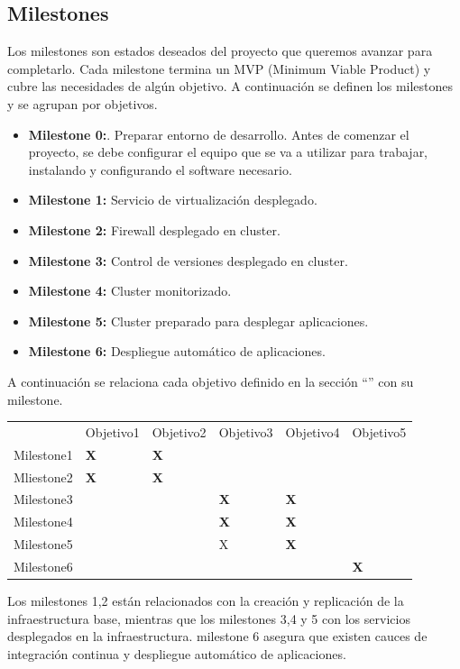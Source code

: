 \subsection{Milestones}
\label{Milestones}
\begin{text}
	Los milestones son estados deseados del proyecto que queremos avanzar para completarlo. Cada milestone termina un MVP (Minimum Viable Product) y cubre las necesidades de algún objetivo. A continuación se definen los milestones y se agrupan por objetivos.
	
	\begin{itemize}
		\item \textbf{Milestone 0:}. Preparar entorno de desarrollo. Antes de comenzar el proyecto, se debe configurar el equipo que se va a utilizar para trabajar, instalando y configurando el software necesario. 
		\item \textbf{Milestone 1:} Servicio de virtualización desplegado. 
		\item \textbf{Milestone 2:} Firewall desplegado en cluster.
		\item \textbf{Milestone 3:} Control de versiones desplegado en cluster.
		\item \textbf{Milestone 4:} Cluster monitorizado.
		\item \textbf{Milestone 5:} Cluster preparado para desplegar aplicaciones.
		\item \textbf{Milestone 6:} Despliegue automático de aplicaciones.
	\end{itemize}
	A continuación se relaciona cada objetivo definido en la sección ``'' con su milestone.
	
	
	\begin{table}[!hbt]
		\begin{tabular}{llllll}
			& Objetivo1         & Objetivo2         & Objetivo3         & Objetivo4         & Objetivo5         \\
			Milestone1 & \textbf{X} & \textbf{X} & \textbf{}  &            &            \\
			Mliestone2 & \textbf{X} & \textbf{X} &            &            &            \\
			Milestone3 &            &            & \textbf{X} & \textbf{X} &            \\
			Milestone4 &            &            & \textbf{X} & \textbf{X} &            \\
			Milestone5 &            &            & X          & \textbf{X} &            \\
			Milestone6 &            &            &            &            & \textbf{X}
		\end{tabular}
	\end{table}
	
	Los milestones 1,2 están relacionados con la creación y replicación de la infraestructura base, mientras que los milestones 3,4 y 5 con los servicios desplegados en la infraestructura. milestone 6 asegura que existen cauces de integración continua y despliegue automático de aplicaciones.
	
\end{text}

